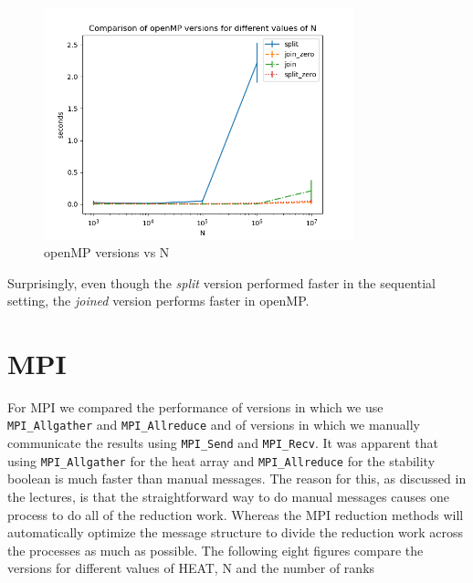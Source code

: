 \documentclass[a4paper]{article}
\begin{document}
\begin{figure}[H]
    \centering
    \includegraphics[width = 0.8\textwidth]{graphs/n/Comparison of openMP versions for different values of N.png}
    \caption{openMP versions vs N}
    \label{fig: orig heat}
\end{figure}

Surprisingly, even though the \textit{split} version performed faster in the sequential setting, the \textit{joined} version performs faster in openMP.

\section{MPI}
For MPI we compared the performance of versions in which we use \texttt{MPI\_Allgather}
and \texttt{MPI\_Allreduce} and of versions in which we manually communicate the results using \texttt{MPI\_Send} and \texttt{MPI\_Recv}. It was apparent that using \texttt{MPI\_Allgather} for the heat array and \texttt{MPI\_Allreduce} for the stability boolean is much faster than manual messages. The reason for this, as discussed in the lectures, is that the straightforward way to do manual messages causes one process to do all of the reduction work. Whereas the MPI reduction methods will automatically optimize the message structure to divide the reduction work across the processes as much as possible. The following eight figures compare the versions for different values of HEAT, N and the number of ranks
\end{document}
